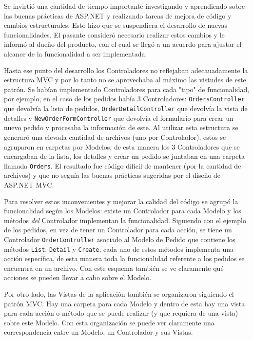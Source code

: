 Se invirtió una cantidad de tiempo importante investigando y aprendiendo sobre las buenas prácticas de ASP.NET y realizando tareas de mejora de código y cambios estructurales. Esto hizo que se suspendiera el desarrollo de nuevas funcionalidades. El pasante consideró necesario realizar estos cambios y le informó al dueño del producto, con el cual se llegó a un acuerdo para ajustar el alcance de la funcionalidad a ser implementada.

Hasta ese punto del desarrollo los Controladores no reflejaban adecauadamente la estructura MVC y por lo tanto no se aprovechaba al máximo las vistudes de este patrón. Se habían implementado Controladores para cada "tipo" de funcionalidad, por ejemplo, en el caso de los pedidos había 3 Controladores: \verb|OrdersController| que devolvía la lista de pedidos, \verb|OrderDetailController| que devolvía la vista de detalles y \verb|NewOrderFormController| que devolvía el formulario para crear un nuevo pedido y procesaba la información de este. Al utilizar esta estructura se generaró una elevada cantidad de archivos (uno por Controlador), estos se agruparon en carpetas por Modelos, de esta manera los 3 Controladores que se encargaban de la lista, los detalles y crear un pedido se juntaban en una carpeta llamada \verb|Orders|. El resultado fue código díficil de mantener (por la cantidad de archivos) y que no seguía las buenas prácticas sugeridas por el diseño de ASP.NET MVC.

Para resolver estos inconvenientes y mejorar la calidad del código se agrupó la funcionalidad según los Modelos: existe un Controlador para cada Modelo y los métodos \emph{del} Controlador implementan la funcionalidad. Siguiendo con el ejemplo de los pedidos, en vez de tener un Controlador para cada acción, se tiene un Controlador \verb|OrderController| asociado al Modelo de Pedido que contiene los métodos \verb|List|, \verb|Detail| y \verb|Create|, cada uno de estos métodos implementa una acción específica, de esta manera toda la funcionalidad referente a los pedidos se encuentra en un archivo. Con este esquema también se ve claramente qué acciones se pueden llevar a cabo sobre el Modelo.

Por otro lado, las Vistas de la aplicación también se organizaron siguiendo el patrón MVC. Hay una carpeta para cada Modelo y dentro de esta hay una vista para cada acción o método que se puede realizar (y que requiera de una vista) sobre este Modelo. Con esta organización se puede ver claramente una correspondencia entre un Modelo, un Controlador y sus Vistas.

